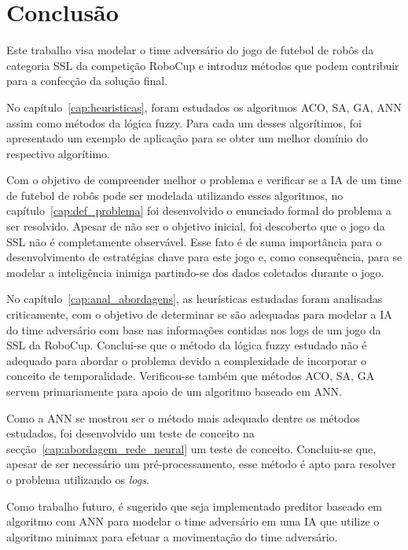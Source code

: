 \chapter{Conclusão}\label{cap:conclusao}

Este trabalho visa modelar o time adversário do jogo de futebol de robôs
da categoria SSL da competição RoboCup e introduz métodos que podem contribuir
para a confecção da solução final.

No capítulo~\ref{cap:heuristicas}, foram estudados os algoritmos ACO, SA, GA,
ANN assim como métodos da lógica fuzzy. Para cada um desses algorítimos, foi
apresentado
um exemplo de aplicação para se obter um melhor domínio do respectivo
algorítimo.

Com o objetivo de compreender melhor o problema e verificar se a IA de um time
de
futebol de robôs pode ser modelada utilizando esses algoritmos, no
capítulo~\ref{cap:def_problema} foi desenvolvido o enunciado formal do problema
a ser resolvido.
Apesar de não ser o objetivo inicial, foi descoberto que o jogo da SSL não é
completamente observável. Esse fato é de suma importância para o desenvolvimento
de estratégias chave para este jogo e, como consequência, para se modelar a
inteligência inimiga partindo-se dos dados coletados durante o jogo.

No capítulo~\ref{cap:anal_abordagens}, as heurísticas estudadas foram analisadas
criticamente, com o objetivo de determinar se são adequadas para modelar a IA
do time adversário com base nas informações contidas nos logs de um jogo da SSL
da RoboCup. Conclui-se que o método da lógica fuzzy estudado não é adequado para
abordar o problema devido a complexidade de incorporar o conceito de
temporalidade.
Verificou-se também que métodos ACO, SA, GA servem primariamente para apoio de
um algoritmo baseado em ANN\@.

Como a ANN se mostrou ser o método mais adequado dentre os métodos estudados,
foi desenvolvido um teste de conceito na secção~\ref{cap:abordagem_rede_neural}
um teste de conceito. Concluiu-se que, apesar de ser necessário um
pré-processamento, esse
método é apto para resolver o problema utilizando os \textit{logs}.

Como trabalho futuro, é sugerido que seja implementado preditor baseado em
algoritmo com ANN para modelar o time adversário em uma IA que utilize o
algoritmo minimax para efetuar a movimentação do time adversário.



